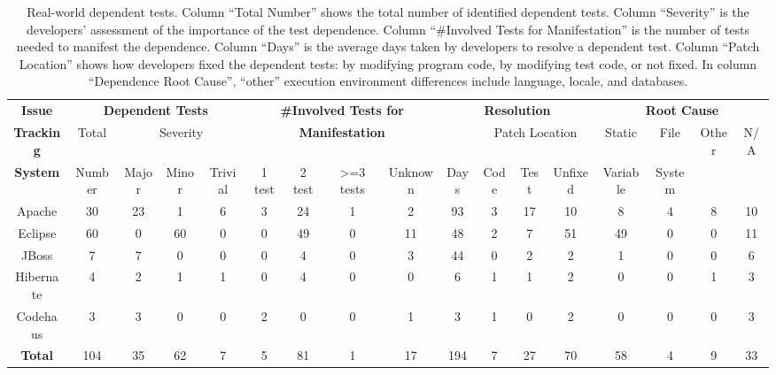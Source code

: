 \begin{table*}[t]
\vspace{1mm}
\centering
\small{
\setlength{\tabcolsep}{.10\tabcolsep}
\begin{tabular}{|c||c|c|c|c||c|c|c|c||c|c|c|c||c|c|c|c|}
\hline
\textbf{Issue}&\multicolumn{4}{|c||}{\textbf{Dependent Tests}}&\multicolumn{4}{|c||}{\textbf{\#Involved Tests for}}&\multicolumn{4}{|c||}{\textbf{Resolution}}&\multicolumn{4}{|c|}{\textbf{Root Cause}}\\
\cline{2-5}\cline{10-17}
\textbf{Tracking} &Total&\multicolumn{3}{|c||}{Severity}&\multicolumn{4}{|c||}{\textbf{Manifestation}}&
&\multicolumn{3}{|c||}{Patch Location}&Static&File & Other & N/A\\
\cline{3-9}\cline{11-13}
\textbf{System}&Number&Major&Minor&Trivial&1 test&2 test&>=3 tests & Unknown&Days&Code&Test&Unfixed&Variable&System& &\\
\hline
Apache&30&23&1&6&3&24&1&2&93&3&17&10&8&4&8 &10\\
\hline
Eclipse&60&0&60&0&0&49&0&11&48&2&7&51&49&0&0 &11\\
\hline
JBoss&7&7&0&0&0&4&0&3&44&0&2&2&1&0& 0 & 6\\
\hline
Hibernate&4&2&1&1&0&4&0&0&6&1&1&2&0&0& 1 & 3\\
\hline
Codehaus&3&3&0&0&2&0&0&1&3&1&0&2&0&0&0 &3\\
\hline
\hline
\textbf{Total} & 104 &35&62&7&5&81&1&17&194&7&27&70&58&4&9&33\\
\hline
\end{tabular}
}
\vspace{-2mm}
\caption{{\label{tab:studyresults}
Real-world dependent tests.
Column ``Total Number'' shows the total number of identified dependent tests.
Column ``Severity'' is the developers' assessment of the importance of the
test dependence.
Column ``\#Involved Tests for Manifestation'' is the number of tests needed
to manifest the dependence. Column ``Days'' is the
average days taken by developers to resolve a dependent test.
Column ``Patch Location'' shows how developers fixed the dependent tests:
by modifying program code, by modifying test code, or not fixed.
In column ``Dependence Root Cause'', ``other'' execution environment
differences include language, locale, and databases.
}
}
\end{table*}
